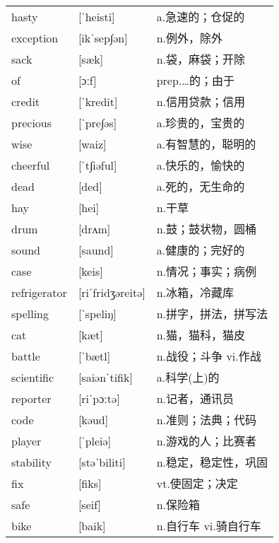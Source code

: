 \documentclass[a4paper]{article}
\begin{document}
\section{}
\begin{tabular}{l l l}

hasty & [ˈheisti] & a.急速的；仓促的 \\
exception & [ikˈsep∫ən] & n.例外，除外 \\
sack & [sæk] & n.袋，麻袋；开除 \\
of & [ɔːf] & prep.…的；由于 \\
credit & [ˈkredit] & n.信用贷款；信用 \\
precious & [ˈpre∫əs] & a.珍贵的，宝贵的 \\
wise & [waiz] & a.有智慧的，聪明的 \\
cheerful & [ˈt∫iəful] & a.快乐的，愉快的 \\
dead & [ded] & a.死的，无生命的 \\
hay & [hei] & n.干草 \\
drum & [drʌm] & n.鼓；鼓状物，圆桶 \\
sound & [saund] & a.健康的；完好的 \\
case & [keis] & n.情况；事实；病例 \\
refrigerator & [riˈfridʒəreitə] & n.冰箱，冷藏库 \\
spelling & [ˈspeliŋ] & n.拼字，拼法，拼写法 \\
cat & [kæt] & n.猫，猫科，猫皮 \\
battle & [ˈbætl] & n.战役；斗争 vi.作战 \\
scientific & [saiənˈtifik] & a.科学(上)的 \\
reporter & [riˈpɔːtə] & n.记者，通讯员 \\
code & [kəud] & n.准则；法典；代码 \\
player & [ˈpleiə] & n.游戏的人；比赛者 \\
stability & [stəˈbiliti] & n.稳定，稳定性，巩固 \\
fix & [fiks] & vt.使固定；决定 \\
safe & [seif] & n.保险箱 \\
bike & [baik] & n.自行车 vi.骑自行车 \\

\end{tabular}
\end{document}
